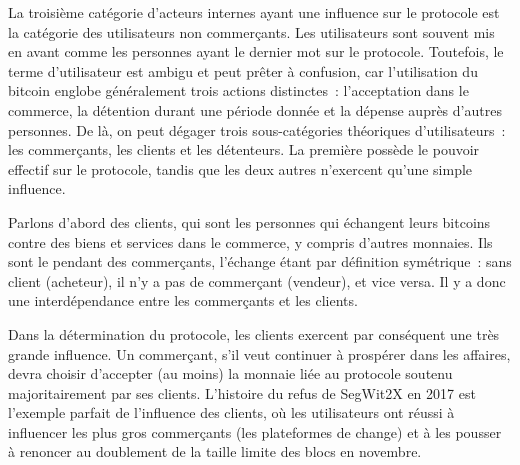 La troisième catégorie d'acteurs internes ayant une influence sur le protocole est la catégorie des utilisateurs non commerçants. Les utilisateurs sont souvent mis en avant comme les personnes ayant le dernier mot sur le protocole. Toutefois, le terme d'utilisateur est ambigu et peut prêter à confusion, car l'utilisation du bitcoin englobe généralement trois actions distinctes~: l'acceptation dans le commerce, la détention durant une période donnée et la dépense auprès d'autres personnes. De là, on peut dégager trois sous-catégories théoriques d'utilisateurs~: les commerçants, les clients et les détenteurs. La première possède le pouvoir effectif sur le protocole, tandis que les deux autres n'exercent qu'une simple influence.


Parlons d'abord des clients, qui sont les personnes qui échangent leurs bitcoins contre des biens et services dans le commerce, y compris d'autres monnaies. Ils sont le pendant des commerçants, l'échange étant par définition symétrique~: sans client (acheteur), il n'y a pas de commerçant (vendeur), et vice versa. Il y a donc une interdépendance entre les commerçants et les clients. %

Dans la détermination du protocole, les clients exercent par conséquent une très grande influence. Un commerçant, s'il veut continuer à prospérer dans les affaires, devra choisir d'accepter (au moins) la monnaie liée au protocole soutenu majoritairement par ses clients. L'histoire du refus de SegWit2X en 2017 est l'exemple parfait de l'influence des clients, où les utilisateurs ont réussi à influencer les plus gros commerçants (les plateformes de change) et à les pousser à renoncer au doublement de la taille limite des blocs en novembre.

